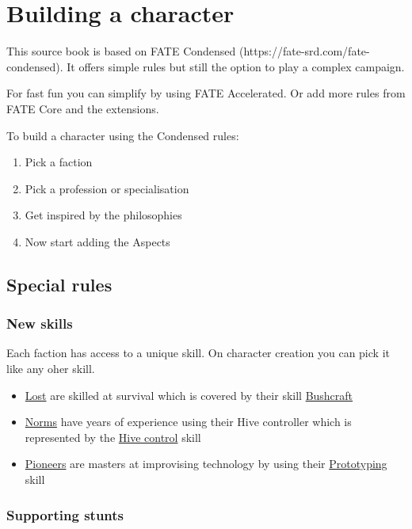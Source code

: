 \chapter{Building a character}

This source book is based on FATE Condensed (https://fate-srd.com/fate-condensed). It offers simple rules but still the option to play a complex campaign.

For fast fun you can simplify by using FATE Accelerated.
Or add more rules from FATE Core and the extensions.

To build a character using the Condensed rules:

\begin{enumerate}
    \item Pick a faction
    \item Pick a profession or specialisation
    \item Get inspired by the philosophies
    \item Now start adding the Aspects
\end{enumerate}

\section{Special rules}

\subsection{New skills}

Each faction has access to a unique skill. On character creation you can pick it like any oher skill.

\begin{itemize}
    \item \hyperref[sec: Lost]{Lost} are skilled at survival which is covered by their skill \hyperref[sec: Bushcraft skill]{Bushcraft}
    \item \hyperref[sec: Norms]{Norms} have years of experience using their Hive controller which is represented by the \hyperref[sec:Hive control skill]{Hive control} skill
    \item \hyperref[sec: Pioneers]{Pioneers} are masters at improvising technology by using their \hyperref[sec:Prototyping skill]{Prototyping} skill
\end{itemize}

\subsection{Supporting stunts}

